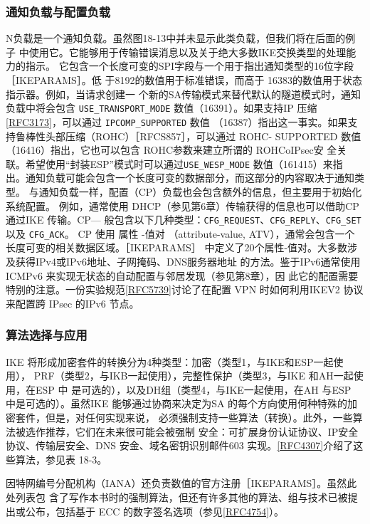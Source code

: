 \subsubsection{通知负载与配置负载}
N负载是一个通知负载。虽然图18-13中并未显示此类负载，但我们将在后面的例子
中使用它。它能够用于传输错误消息以及关于绝大多数IKE交换类型的处理能力的指示。
它包含一个长度可变的SPI字段与一个用于指出通知类型的16位字段［IKEPARAMS］。低
于8192的数值用于标准错误，而高于 16383的数值用于状态指示器。例如，当请求创建一
个新的SA传输模式来替代默认的隧道模式时，通知负载中将会包含 \verb|USE_TRANSPORT_MODE|
 数值（16391）。如果支持IP 压缩\href{https://www.rfc-editor.org/rfc/rfc3173}{[RFC3173]}，可以通过 \verb|IPCOMP_SUPPORTED| 数值
（16387）指出这一事实。如果支持鲁棒性头部压缩（ROHC）［RFCS857］，可以通过 ROHC-
SUPPORTED 数值（16416）指出，它也可以包含 ROHC参数来建立所谓的 ROHCoIPsec安
全关联。希望使用“封装ESP”模式时可以通过\verb|USE_WESP_MODE| 数值（161415）来指
出。通知负载可能会包含一个长度可变的数据部分，而这部分的内容取决于通知类型。
与通知负载一样，配置（CP）负载也会包含额外的信息，但主要用于初始化系统配置。
例如，通常使用 DHCP（参见第6章）传输获得的信息也可以借助CP 通过IKE 传输。CP—
般包含以下几种类型：\verb|CFG_REQUEST|、\verb|CFG_REPLY|、\verb|CFG_SET| 以及 \verb|CFG_ACK|。 CP 使用
属性 -值对 （attribute-value, ATV），通常会包含一个长度可变的相关数据区域。［IKEPARAMS］
中定义了20个属性-值对。大多数涉及获得IPv4或IPv6地址、子网掩码、DNS服务器地址
的方法。鉴于IPv6通常使用ICMPv6 来实现无状态的自动配置与邻居发现（参见第8章），因
此它的配置需要特别的注意。一份实验规范\href{https://www.rfc-editor.org/rfc/rfc5739}{[RFC5739]}讨论了在配置 VPN 时如何利用IKEV2
协议来配置跨 IPsec 的IPv6 节点。

\subsubsection{算法选择与应用}
IKE 将形成加密套件的转换分为4种类型：加密（类型1，与IKE和ESP一起使用），
PRF（类型2，与IKB一起使用），完整性保护（类型3，与IKE 和AH一起使用，在ESP 中
是可选的），以及DH组（类型4，与IKE一起使用，在AH 与ESP 中是可选的）。虽然IKE
能够通过协商来决定为SA 的每个方向使用何种特殊的加密套件，但是，对任何实现来说，
必须强制支持一些算法（转换）。此外，一些算法被选作推荐，它们在未来很可能会被强制
安全：可扩展身份认证协议、IP安全协议、传输层安全、DNS 安金、域名密钥识别邮件603
实现。\href{https://www.rfc-editor.org/rfc/rfc4307}{[RFC4307]}介绍了这些算法，参见表 18-3。

因特网编号分配机构（IANA）还负责数值的官方注册［IKEPARAMS］。虽然此处列表包
含了写作本书时的强制算法，但还有许多其他的算法、组与技术已被提出或公布，包括基于
ECC 的数字签名选项（参见\href{https://www.rfc-editor.org/rfc/rfc4754}{[RFC4754]}）。

